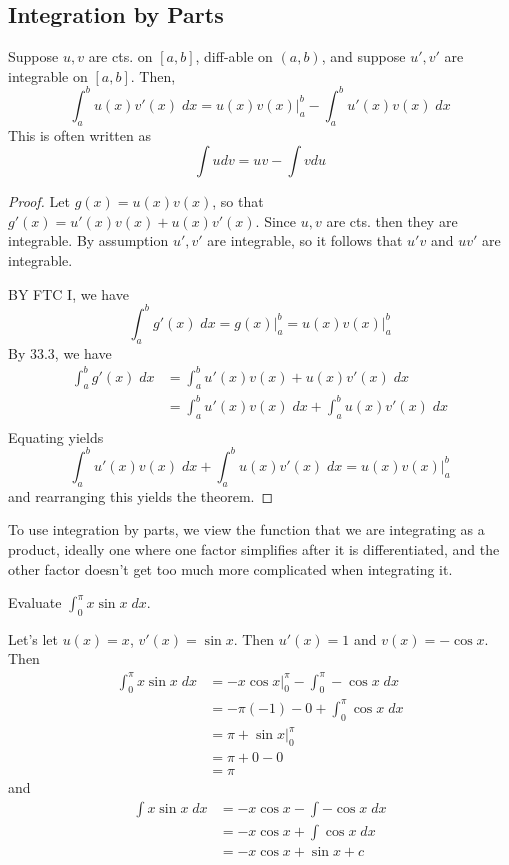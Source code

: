 \documentclass{article}
\begin{document}
  \subsection{Integration by Parts}
  \begin{cthm}
    Suppose $u, v$ are cts. on $[a, b]$, diff-able on $(a, b)$, and suppose $u', v'$ are integrable on $[a, b]$. Then, \[
      \int_a^b u(x)v'(x) \; dx = u(x)v(x)\Big|_a^b - \int_a^b u'(x)v(x) \; dx
    \] This is often written as \[
      \int udv = uv - \int vdu
    \]
  \end{cthm}
  \begin{proof}
    Let $g(x) = u(x)v(x)$, so that $g'(x) = u'(x)v(x) + u(x)v'(x)$. Since $u, v$ are cts. then they are integrable. By assumption $u', v'$ are integrable, so it follows that $u'v$ and $uv'$ are integrable.

    BY FTC I, we have \[
      \int_a^b g'(x) \; dx = g(x)\Big|_a^b = u(x)v(x)\Big|_a^b
    \]
    By 33.3, we have
    \begin{align*}
      \int_a^b g'(x) \; dx &= \int_a^b u'(x)v(x) + u(x)v'(x) \; dx\\
      &= \int_a^b u'(x)v(x) \; dx + \int_a^b u(x)v'(x) \; dx\\
    \end{align*}
    Equating yields \[
      \int_a^b u'(x)v(x) \; dx + \int_a^b u(x)v'(x) \; dx = u(x)v(x)\Big|_a^b
    \]
    and rearranging this yields the theorem.
  \end{proof}
  \begin{remark}
    To use integration by parts, we view the function that we are integrating as a product, ideally one where one factor simplifies after it is differentiated, and the other factor doesn't get too much more complicated when integrating it.
  \end{remark}
  \begin{example}
    Evaluate $\int_0^\pi x\sin x \; dx$.

    Let's let $u(x) = x$, $v'(x) = \sin x$. Then $u'(x) = 1$ and $v(x) = -\cos x$.
    Then
    \begin{align*}
      \int_0^\pi x\sin x \; dx &= -x \cos x\Big|_0^\pi - \int_0^\pi -\cos x \; dx\\
      &= -\pi(-1) - 0 + \int_0^\pi \cos x \; dx\\
      &= \pi + \sin x\Big|_0^\pi\\
      &= \pi + 0 - 0\\
      &= \pi
    \end{align*}
    and
    \begin{align*}
      \int x \sin x \; dx &= -x \cos x - \int -\cos x \; dx\\
      &= -x \cos x + \int \cos x \; dx\\
      &= -x \cos x + \sin x + c
    \end{align*}
  \end{example}
\end{document}

